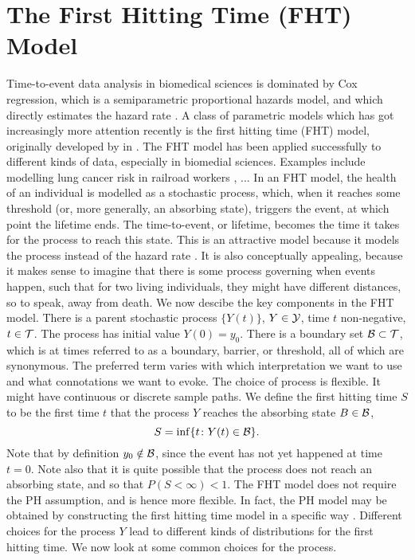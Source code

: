 \section{The First Hitting Time (FHT) Model}\label{sec:fht}
Time-to-event data analysis in biomedical sciences is dominated by Cox regression, which is a semiparametric proportional hazards model, and which directly estimates the hazard rate \citep{stogiannis-2013}. A class of parametric models which has got increasingly more attention recently is the first hitting time (FHT) model, originally developed by \citeauthor{whitmore1986} in \citeyear{whitmore1986} \citep{whitmore1986,leewhitmore2006}. The FHT model has been applied successfully to different kinds of data, especially in biomedial sciences. Examples include modelling lung cancer risk in railroad workers \citep{leewhitmore2004}, ... In an FHT model, the health of an individual is modelled as a stochastic process, which, when it reaches some threshold (or, more generally, an absorbing state), triggers the event, at which point the lifetime ends. The time-to-event, or lifetime, becomes the time it takes for the process to reach this state. This is an attractive model because it models the process instead of the hazard rate \citep{aalengjessing2001}. It is also conceptually appealing, because it makes sense to imagine that there is some process governing when events happen, such that for two living individuals, they might have different distances, so to speak, away from death. %
We now descibe the key components in the FHT model. There is a parent stochastic process $\{Y(t)\}$, $Y\in\mathcal{Y}$, time $t$ non-negative, $t\in\mathcal{T}$. The process has initial value $Y(0)=y_0$. There is a boundary set $\mathcal{B}\subset\mathcal{T}$, which is at times referred to as a boundary, barrier, or threshold, all of which are synonymous. The preferred term varies with which interpretation we want to use and what connotations we want to evoke.
The choice of process is flexible. It might have continuous or discrete sample paths. We define the first hitting time $S$ to be the first time $t$ that the process $Y$ reaches the absorbing state $B\in\mathcal{B}$,
\begin{equation}
    S=\inf\{t\colon Y(t)\in\mathcal{B}\}.
\end{equation}
Note that by definition $y_0\notin\mathcal{B}$, since the event has not yet happened at time $t=0$. Note also that it is quite possible that the process does not reach an absorbing state, and so that $P(S<\infty)<1$. The FHT model does not require the PH assumption, and is hence more flexible. In fact, the PH model may be obtained by constructing the first hitting time model in a specific way \citep{lee2010}. Different choices for the process $Y$ lead to different kinds of distributions for the first hitting time. We now look at some common choices for the process.

